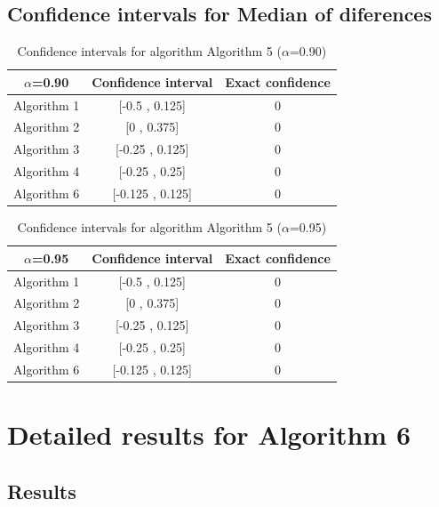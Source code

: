 \documentclass[a4paper,10pt]{article}
\begin{document}
\subsection{Confidence intervals for Median of diferences}

\begin{table}[!htp]
\centering\small
\begin{tabular}{
|c|c|c|}
\hline
 $\alpha$=0.90 & Confidence interval & Exact confidence \\ \hline 
Algorithm 1 & [-0.5 , 0.125] & 0\\ \hline 
Algorithm 2 & [0 , 0.375] & 0\\ \hline 
Algorithm 3 & [-0.25 , 0.125] & 0\\ \hline 
Algorithm 4 & [-0.25 , 0.25] & 0\\ \hline 
Algorithm 6 & [-0.125 , 0.125] & 0\\ \hline 

\end{tabular}
\caption{Confidence intervals for algorithm Algorithm 5 ($\alpha$=0.90)}
\end{table}
\begin{table}[!htp]
\centering\small
\begin{tabular}{
|c|c|c|}
\hline
 $\alpha$=0.95 & Confidence interval & Exact confidence \\ \hline 
Algorithm 1 & [-0.5 , 0.125] & 0\\ \hline 
Algorithm 2 & [0 , 0.375] & 0\\ \hline 
Algorithm 3 & [-0.25 , 0.125] & 0\\ \hline 
Algorithm 4 & [-0.25 , 0.25] & 0\\ \hline 
Algorithm 6 & [-0.125 , 0.125] & 0\\ \hline 

\end{tabular}
\caption{Confidence intervals for algorithm Algorithm 5 ($\alpha$=0.95)}
\end{table}

 \clearpage 


\section{Detailed results for Algorithm 6}


\subsection{Results}
\end{document}
